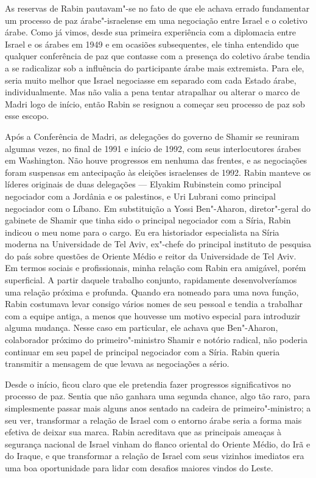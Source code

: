 As reservas de Rabin pautavam"-se no fato de que ele achava errado
fundamentar um processo de paz árabe"-israelense em uma negociação entre
Israel e o coletivo árabe. Como já vimos, desde sua primeira experiência
com a diplomacia entre Israel e os árabes em 1949 e em ocasiões
subsequentes, ele tinha entendido que qualquer conferência de paz que
contasse com a presença do coletivo árabe tendia a se radicalizar sob a
influência do participante árabe mais extremista. Para ele, seria muito
melhor que Israel negociasse em separado com cada Estado árabe,
individualmente. Mas não valia a pena tentar atrapalhar ou alterar o
marco de Madri logo de início, então Rabin se resignou a começar seu
processo de paz sob esse escopo.

Após a Conferência de Madri, as delegações do governo de Shamir se
reuniram algumas vezes, no final de 1991 e início de 1992, com seus
interlocutores árabes em Washington. Não houve progressos em nenhuma das
frentes, e as negociações foram suspensas em antecipação às eleições
israelenses de 1992. Rabin manteve os líderes originais de duas
delegações --- Elyakim Rubinstein como principal negociador com a
Jordânia e os palestinos, e Uri Lubrani como principal negociador com o
Líbano. Em substituição a Yossi Ben"-Aharon, diretor"-geral do gabinete de
Shamir que tinha sido o principal negociador com a Síria, Rabin indicou
o meu nome para o cargo. Eu era historiador especialista na Síria
moderna na Universidade de Tel Aviv, ex"-chefe do principal instituto de
pesquisa do país sobre questões de Oriente Médio e reitor da
Universidade de Tel Aviv. Em termos sociais e profissionais, minha
relação com Rabin era amigável, porém superficial. A partir daquele
trabalho conjunto, rapidamente desenvolveríamos uma relação próxima e
profunda. Quando era nomeado para uma nova função, Rabin costumava levar
consigo vários nomes de seu pessoal e tendia a trabalhar com a equipe
antiga, a menos que houvesse um motivo especial para introduzir alguma
mudança. Nesse caso em particular, ele achava que Ben"-Aharon,
colaborador próximo do primeiro"-ministro Shamir e notório radical, não
poderia continuar em seu papel de principal negociador com a Síria.
Rabin queria transmitir a mensagem de que levava as negociações a sério.

Desde o início, ficou claro que ele pretendia fazer progressos
significativos no processo de paz. Sentia que não ganhara uma segunda
chance, algo tão raro, para simplesmente passar mais alguns anos sentado
na cadeira de primeiro"-ministro; a seu ver, transformar a relação de
Israel com o entorno árabe seria a forma mais efetiva de deixar sua
marca. Rabin acreditava que as principais ameaças à segurança nacional
de Israel vinham do flanco oriental do Oriente Médio, do Irã e do
Iraque, e que transformar a relação de Israel com seus vizinhos
imediatos era uma boa oportunidade para lidar com desafios maiores
vindos do Leste.

